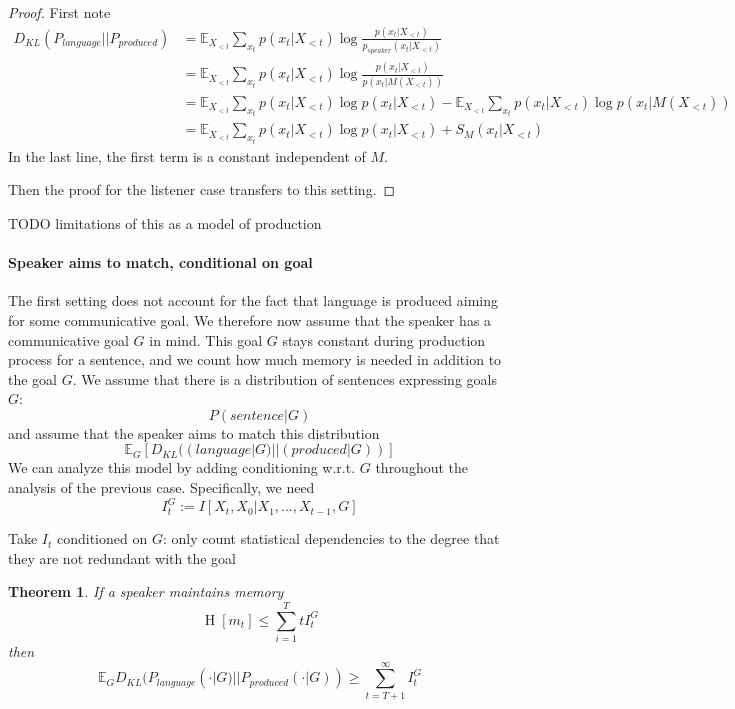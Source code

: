 \documentclass[11pt,letterpaper]{article}
\newcommand{\E}[0]{\mathbb{E}}
\newcounter{theorem}
\newtheorem{thm}[theorem]{Theorem}
\begin{document}
\begin{proof}
First note
\begin{align}
D_{KL}(P_{language}||P_{produced}) & = \E_{X_{<t}} \sum_{x_t} p(x_t|X_{<t}) \log \frac{p(x_t|X_{<t})}{p_{speaker}(x_t|X_{<t})} \\
& = \E_{X_{<t}} \sum_{x_t} p(x_t|X_{<t}) \log \frac{p(x_t|X_{<t})}{p(x_t|M(X_{<t}))} \\
& = \E_{X_{<t}} \sum_{x_t} p(x_t|X_{<t}) \log p(x_t|X_{<t}) - \E_{X_{<t}} \sum_{x_t} p(x_t|X_{<t}) \log p(x_t|M(X_{<t})) \\
	& = \E_{X_{<t}} \sum_{x_t} p(x_t|X_{<t}) \log p(x_t|X_{<t}) + S_M(x_t|X_{<t})
\end{align}
In the last line, the first term is a constant independent of $M$.

Then the proof for the listener case transfers to this setting.
\end{proof}

TODO limitations of this as a model of production




\paragraph{Speaker aims to match, conditional on goal}
The first setting does not account for the fact that language is produced aiming for some communicative goal.
We therefore now assume that the speaker has a communicative goal $G$ in mind.
This goal $G$ stays constant during production process for a sentence, and we count how much memory is needed in addition to the goal $G$.
We assume that there is a distribution of sentences expressing goals $G$:
\begin{equation}
	P(sentence|G)
\end{equation}
and assume that the speaker aims to match this distribution
\begin{equation}
\mathbb{E}_G[D_{KL}((language|G)||(produced|G))]
\end{equation}
We can analyze this model by adding conditioning w.r.t. $G$ throughout the analysis of the previous case.
Specifically, we need
\begin{equation}
I_t^G := I[X_t, X_0|X_1, \dots, X_{t-1}, G]
\end{equation}

Take $I_t$ conditioned on $G$: only count statistical dependencies to the degree that they are not redundant with the goal


\begin{thm}
If a speaker maintains memory
	\begin{equation}
		\operatorname{H}[m_t] \leq \sum_{i=1}^T tI_t^G
	\end{equation}
	then 
\begin{equation}
\E_G	D_{KL}(P_{language}(\cdot|G)||P_{produced}(\cdot|G)) \geq \sum_{t=T+1}^\infty I_t^G
\end{equation}
\end{thm}
\end{document}
